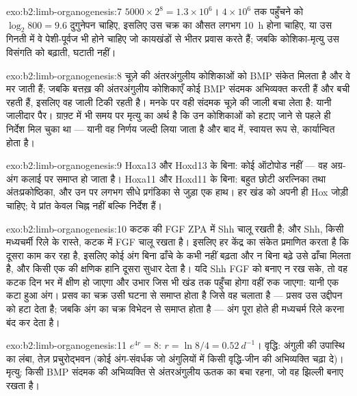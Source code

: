 \begin{solution}{exo:b2:limb-organogenesis:7}
$5000\times 2^{8} = 1.3\times 10^{6}$। $4\times 10^{6}$ तक पहुँचने को
$\log_2 800 = 9.6$ दुगुनेपन चाहिए, इसलिए उस चक्र का औसत लगभग
\qty{10}{h} होना चाहिए, या उस गिनती में वे पेशी-पूर्वज भी होने चाहिए जो
कायखंडों से भीतर प्रवास करते हैं; जबकि कोशिका-मृत्यु उस विसंगति को
बढ़ाती, घटाती नहीं।
\end{solution}

\begin{solution}{exo:b2:limb-organogenesis:8}
चूज़े की अंतरअंगुलीय कोशिकाओं को BMP संकेत मिलता है और वे मर जाती हैं;
जबकि बत्तख़ की अंतरअंगुलीय कोशिकाएँ कोई BMP संदमक अभिव्यक्त करती हैं और
बची रहती हैं, इसलिए वह जाली टिकी रहती है। मनके पर वही संदमक चूज़े की जाली
बचा लेता है: यानी जालीदार पैर। ग्राफ़्ट में भी समय पर मृत्यु का अर्थ है
कि उन कोशिकाओं को हटाए जाने से पहले ही निर्देश मिल चुका था --- यानी वह
निर्णय जल्दी लिया जाता है और बाद में, स्वायत्त रूप से, कार्यान्वित होता है।
\end{solution}

\begin{solution}{exo:b2:limb-organogenesis:9}
Hoxa13 और Hoxd13 के बिना: कोई ऑटोपोड नहीं --- वह अग्र-अंग
कलाई पर समाप्त हो जाता है। Hoxa11 और Hoxd11 के बिना: बहुत छोटी अरत्निका
तथा अंतःप्रकोष्ठिका, और उन पर लगभग सीधे प्रगंडिका से जुड़ा एक हाथ। हर खंड
को अपनी ही Hox जोड़ी चाहिए; वे प्रांत केवल चिह्न नहीं बल्कि
निर्देश हैं।
\end{solution}

\begin{solution}{exo:b2:limb-organogenesis:10}
कटक की FGF ZPA में Shh चालू रखती है; और Shh, किसी मध्यचर्मी
रिले के रास्ते, कटक में FGF चालू रखता है। इसलिए हर केंद्र का संकेत
प्रमाणित करता है कि दूसरा काम कर रहा है, इसलिए कोई अंग बिना ढाँचे के
कभी नहीं बढ़ता और न बिना बढ़े उसे ढाँचा मिलता है, और किसी एक की क्षणिक
हानि दूसरा सुधार देता है। यदि Shh FGF को बनाए न रख सके,
तो वह कटक दिन भर में क्षीण हो जाएगा और उभार जिस भी खंड तक पहुँचा
होगा वहीं रुक जाएगा: यानी एक कटा हुआ अंग। प्रसव का
चक्र उसी घटना से समाप्त होता है जिसे वह चलाता है --- प्रसव उस
उद्दीपन को हटा देता है; जबकि अंग का चक्र विभेदन से समाप्त होता है ---
अंग पूरा होते ही मध्यचर्म रिले करना बंद कर देता है।
\end{solution}

\begin{solution}{exo:b2:limb-organogenesis:11}
$e^{4r} = 8$: $r = \ln 8/4 = \qty{0.52}{d^{-1}}$। वृद्धि: अंगुली की
उपास्थि का लंबा, तेज़ प्रचुरोद्भवन (कोई अंग-संवर्धक जो अंगुलियों में
किसी वृद्धि-जीन की अभिव्यक्ति चढ़ा दे)। मृत्यु: किसी BMP संदमक की
अभिव्यक्ति से अंतरअंगुलीय ऊतक का बचा रहना,
जो वह झिल्ली बनाए रखता है।
\end{solution}

